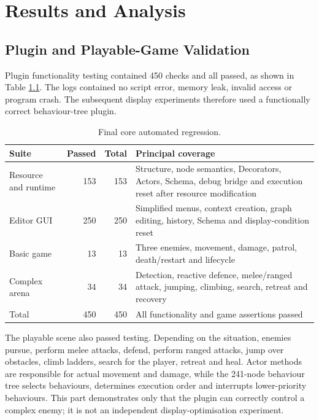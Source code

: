 \chapter{Results and Analysis}
\label{ch:results}

\section{Plugin and Playable-Game Validation}

Plugin functionality testing contained 450 checks and all passed, as shown in Table \ref{tab:coretests}. The logs contained no script error, memory leak, invalid access or program crash. The subsequent display experiments therefore used a functionally correct behaviour-tree plugin.

\begin{table}[htbp]
\centering\caption{Final core automated regression.}\label{tab:coretests}
\begin{tabular}{lrrp{}}
\toprule Suite & Passed & Total & Principal coverage \\
\midrule
Resource and runtime & 153 & 153 & Structure, node semantics, Decorators, Actors, Schema, debug bridge and execution reset after resource modification\\
Editor GUI & 250 & 250 & Simplified menus, context creation, graph editing, history, Schema and display-condition reset\\
Basic game & 13 & 13 & Three enemies, movement, damage, patrol, death/restart and lifecycle\\
Complex arena & 34 & 34 & Detection, reactive defence, melee/ranged attack, jumping, climbing, search, retreat and recovery\\
\midrule Total & 450 & 450 & All functionality and game assertions passed\\
\bottomrule
\end{tabular}
\end{table}

The playable scene also passed testing. Depending on the situation, enemies pursue, perform melee attacks, defend, perform ranged attacks, jump over obstacles, climb ladders, search for the player, retreat and heal. Actor methods are responsible for actual movement and damage, while the 241-node behaviour tree selects behaviours, determines execution order and interrupts lower-priority behaviours. This part demonstrates only that the plugin can correctly control a complex enemy; it is not an independent display-optimisation experiment.

